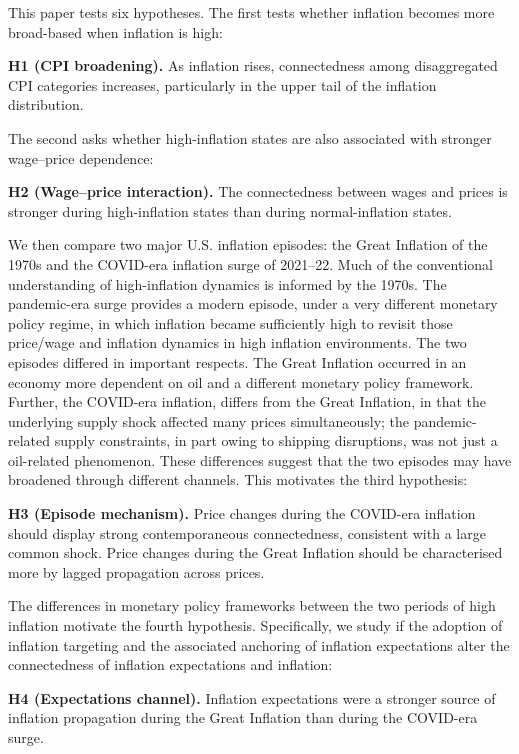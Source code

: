 \documentclass{article}
\begin{document}
This paper tests six hypotheses. The first tests whether
inflation becomes more broad-based when inflation is high:

\noindent\textbf{H1 (CPI broadening).} As inflation rises, connectedness among
disaggregated CPI categories increases, particularly in the upper tail of the
inflation distribution.

The second asks whether high-inflation states are also associated with stronger
wage--price dependence:

\noindent\textbf{H2 (Wage--price interaction).} The connectedness between wages
and prices is stronger during high-inflation states than during normal-inflation
states.

We then compare two major U.S. inflation episodes: the Great Inflation of the
1970s and the COVID-era inflation surge of 2021--22. Much of the conventional
understanding of high-inflation dynamics is informed by the 1970s. The
pandemic-era surge provides a modern episode, under a very different
monetary policy regime, in which inflation became sufficiently high to revisit
those price/wage and inflation dynamics in high inflation environments. The two episodes differed in important respects. The Great
Inflation occurred in an economy more dependent on oil and a different monetary policy framework. Further, the COVID-era inflation, differs from the Great Inflation, in that the underlying supply shock affected many prices simultaneously; the pandemic-related supply constraints, in part owing to shipping disruptions, was not just a oil-related phenomenon. These differences suggest that the two episodes may have
broadened through different channels. This motivates the third hypothesis:

\noindent\textbf{H3 (Episode mechanism).} Price changes during the COVID-era inflation should display strong contemporaneous connectedness, consistent with a large common
shock. Price changes during the Great Inflation should be characterised more by lagged propagation
across prices.

The differences in monetary policy frameworks between the two periods of high inflation motivate the fourth hypothesis. Specifically, we study if the adoption of inflation targeting and the associated anchoring of inflation expectations alter the
connectedness of inflation expectations and inflation:

\noindent\textbf{H4 (Expectations channel).} Inflation expectations were a
stronger source of inflation propagation during the Great Inflation than during
the COVID-era surge.
\end{document}
